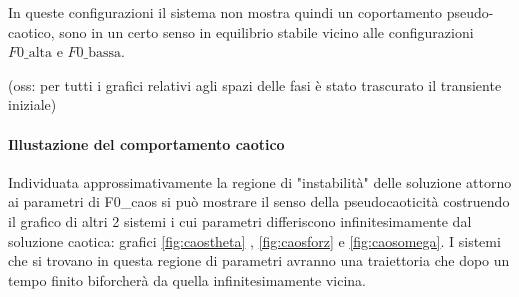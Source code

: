 \documentclass[11pt]{article}
\begin{document}
In queste configurazioni il sistema non mostra quindi un coportamento pseudo-caotico, sono in un certo senso in equilibrio stabile vicino alle configurazioni $F0\_\textrm{alta} $ e $F0\_\textrm{bassa} $.

(oss: per tutti i grafici relativi agli spazi delle fasi è stato trascurato il transiente iniziale)

\paragraph{Illustazione del comportamento caotico}

Individuata approssimativamente la regione di "instabilità" delle soluzione attorno ai parametri di F0\_caos si può mostrare il senso della pseudocaoticità costruendo il grafico di altri 2 sistemi i cui parametri differiscono infinitesimamente dal soluzione caotica: grafici \ref{fig:caostheta} , \ref{fig:caosforz} e \ref{fig:caosomega}.
I sistemi che si trovano in questa regione di parametri avranno una traiettoria che dopo un tempo finito biforcherà da quella infinitesimamente vicina.
\end{document}
